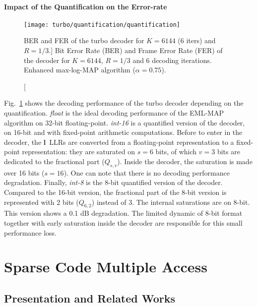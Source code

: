 \paragraph{Impact of the Quantification on the Error-rate}

\begin{figure}[htp]
  \centering
  \texttt{[image: turbo/quantification/quantification]}
  \caption
    [BER and FER of the turbo decoder for $K = 6144$ (6 iters) and $R=1/3$.]
    {Bit Error Rate (BER) and Frame Error Rate (FER) of the decoder for $K =
    6144$, $R=1/3$ and 6 decoding iterations. Enhanced max-log-MAP algorithm
    ($\alpha = 0.75$).}
  \label{plot:alg_turbo_quantification}
\end{figure}

Fig.~\ref{plot:alg_turbo_quantification} shows the decoding performance of the
turbo decoder depending on the quantification. \emph{float} is the ideal
decoding performance of the EML-MAP algorithm on 32-bit floating-point.
\emph{int-16} is a quantified version of the decoder, on 16-bit and with
fixed-point arithmetic computations. Before to enter in the decoder, the
$\bm{l}$~LLRs are converted from a floating-point representation to a
fixed-point representation: they are saturated on $s = 6$ bits, of which $v = 3$
bits are dedicated to the fractional part ($Q_{s,v}$). Inside the decoder, the
saturation is made over 16 bits ($s = 16$). One can note that there is no
decoding performance degradation. Finally, \emph{int-8} is the 8-bit quantified
version of the decoder. Compared to the 16-bit version, the fractional part of
the 8-bit version is represented with 2 bits ($Q_{6,2}$) instead of 3. The
internal saturations are on 8-bit. This version shows a 0.1 dB degradation. The
limited dynamic of 8-bit format together with early saturation inside the
decoder are responsible for this small performance loss.

\section{Sparse Code Multiple Access}

\subsection{Presentation and Related Works}

